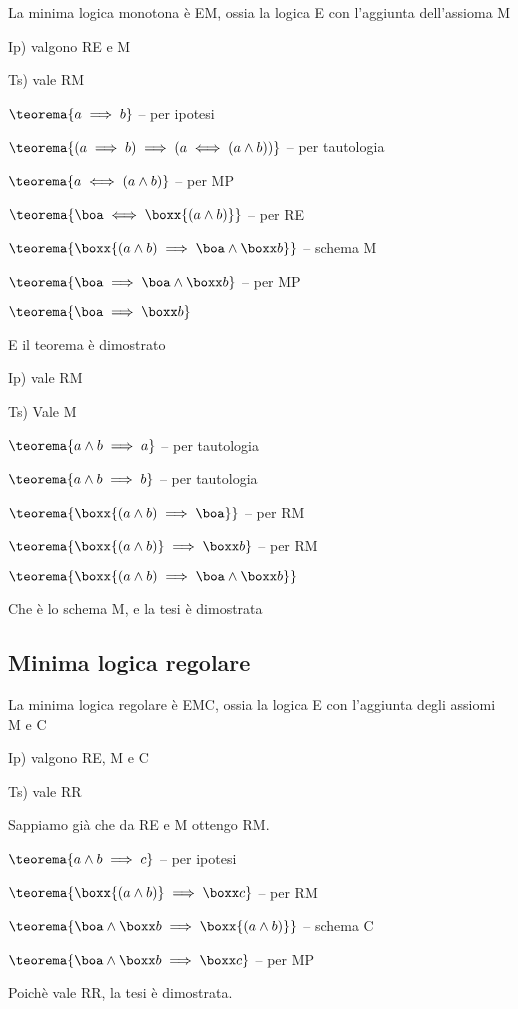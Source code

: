 La minima logica monotona è EM, ossia la logica E con l'aggiunta dell'assioma
M

Ip) valgono RE e M

Ts) vale RM

$\teorema{a\implies b}$ -- per ipotesi

$\teorema{(a\implies b)\implies(a\iff(a\wedge b))}$ -- per tautologia

$\teorema{a\iff(a\wedge b)}$ -- per MP 

$\teorema{\boa\iff\boxx{(a\wedge b)}}$ -- per RE

$\teorema{\boxx{(a\wedge b)\implies\boa\wedge\boxx b}}$ -- schema
M

$\teorema{\boa\implies\boa\wedge\boxx b}$ -- per MP

$\teorema{\boa\implies\boxx b}$

E il teorema è dimostrato

Ip) vale RM

Ts) Vale M

$\teorema{a\wedge b\implies a}$ -- per tautologia

$\teorema{a\wedge b\implies b}$ -- per tautologia

$\teorema{\boxx{(a\wedge b)\implies\boa}}$ -- per RM

$\teorema{\boxx{(a\wedge b)}\implies\boxx b}$ -- per RM

$\teorema{\boxx{(a\wedge b)\implies\boa\wedge\boxx b}}$ 

Che è lo schema M, e la tesi è dimostrata


\subsection{Minima logica regolare}

La minima logica regolare è EMC, ossia la logica E con l'aggiunta
degli assiomi M e C

Ip) valgono RE, M e C

Ts) vale RR

Sappiamo già che da RE e M ottengo RM.

$\teorema{a\wedge b\implies c}$ -- per ipotesi

$\teorema{\boxx{(a\wedge b)}\implies\boxx c}$ -- per RM

$\teorema{\boa\wedge\boxx b\implies\boxx{(a\wedge b)}}$ -- schema
C

$\teorema{\boa\wedge\boxx b\implies\boxx c}$ -- per MP

Poichè vale RR, la tesi è dimostrata.


